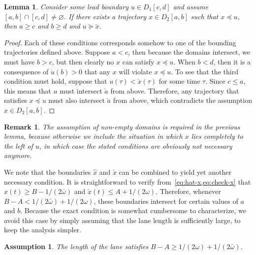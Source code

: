 \documentclass[a4paper]{report}
\theoremstyle{definition}
\theoremstyle{plain}
\newtheorem{lemma}{Lemma}[chapter]
\newtheorem{assump}{Assumption}[chapter]
\newtheorem{remark}{Remark}[chapter]
\begin{document}
\begin{lemma}\label{lemma:necessary-conditions}
  Consider some lead boundary $u \in D_{1}[c,d]$ and assume
  $[a,b] \cap [c,d] \neq \varnothing$. If there exists a trajectory
  $x \in D_{2}[a, b]$ such that $x \preceq u$, then $a \geq c$ and $b \geq d$ and $u \succeq \check{x}$.
\end{lemma}
\pagebreak[1]
\begin{proof}
  Each of these conditions corresponds somehow to one of the bounding
  trajectories defined above.
  Suppose $a < c$, then because the domains intersect, we must have $b > c$, but
  then clearly no $x$ can satisfy $x \preceq u$.
  When $b < d$, then it is a consequence of $\dot{u}(b) > 0$ that any $x$ will
  violate $x \preceq u$.
  To see that the third condition must hold, suppose that $u(\tau) < \check{x}(\tau)$
  for some time $\tau$. Since $c \leq a$, this means that $u$ must intersect
  $\check{a}$ from above. Therefore, any trajectory that satisfies $x \preceq u$
  must also intersect $\check{a}$ from above, which contradicts the assumption
  $x \in D_{2}[a,b]$.
\end{proof}

\begin{remark}
  The assumption of non-empty domains is required in the previous lemma, because
  otherwise we include the situation in which $x$ lies completely to the left of
  $u$, in which case the stated conditions are obviously not necessary anymore.
\end{remark}

We note that the boundaries $\hat{x}$ and $\check{x}$ can be combined to
yield yet another necessary condition.
%
It is straightforward to verify from~\cref{eq:hat-x,eq:check-x} that
$\hat{x}(t) \geq B - 1/(2\bar{\omega})$ and $\check{x}(t) \leq A + 1/(2\omega)$.
%
Therefore, whenever $B - A < 1/(2\bar{\omega}) + 1/(2\omega)$, these boundaries intersect
for certain values of $a$ and $b$.
%
Because the exact condition is somewhat cumbersome to characterize, we avoid
this case by simply assuming that the lane length is sufficiently large, to keep
the analysis simpler.

\begin{assump}\label{assump:lane-length}
  The length of the lane satisfies $B - A \geq 1/(2\omega) + 1/(2\bar{\omega})$.
\end{assump}
\end{document}
